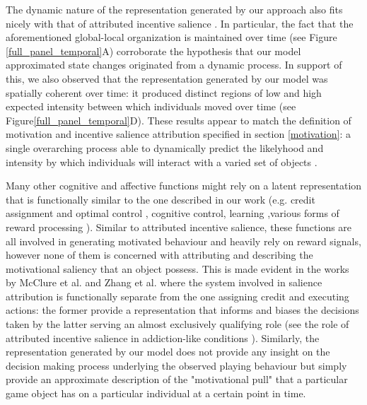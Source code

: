 The dynamic nature of the representation generated by our approach also fits nicely with that of attributed incentive salience \cite{toates1994comparing,robinson1993neural,zhang2009neural,tindell2009dynamic,berridge2012prediction}. In particular, the fact that the aforementioned global-local organization is maintained over time (see Figure \ref{full_panel_temporal}A) corroborate the hypothesis that our model approximated state changes originated from a dynamic process. In support of this, we also observed that the representation generated by our model was spatially coherent over time: it produced distinct regions of low and high expected intensity between which individuals moved over time (see Figure\ref{full_panel_temporal}D). These results appear to match the definition of motivation and incentive salience attribution specified in section \ref{motivation}: a single overarching process able to dynamically predict the likelyhood and intensity by which individuals will interact with a varied set of objects \cite{simpson2016behavioral,toates1994comparing,berridge2004motivation,zhang2009neural}. 

Many other cognitive and affective functions might rely on a latent representation that is functionally similar to the one described in our work (e.g. credit assignment and optimal control \cite{wang2018prefrontal, barto2004reinforcement, friston2012active}, cognitive control, learning \cite{skinner1965science},various forms of reward processing \cite{schultz1997neural, schultz2000reward}). Similar to attributed incentive salience, these functions are all involved in generating motivated behaviour and heavily rely on reward signals, however none of them is concerned with attributing and describing the motivational saliency that an object possess. This is made evident in the works by McClure et al. \cite{mcclure2003computational} and Zhang et al. \cite{zhang2009neural} where the system involved in salience attribution is functionally separate from the one assigning credit and executing actions: the former provide a representation that informs and biases the decisions taken by the latter serving an almost exclusively qualifying role (see the role of attributed incentive salience in addiction-like conditions \cite{robinson1993neural}). Similarly, the representation generated by our model does not provide any insight on the decision making process underlying the observed playing behaviour but simply provide an approximate description of the "motivational pull" that a particular game object has on a particular individual at a certain point in time. 

